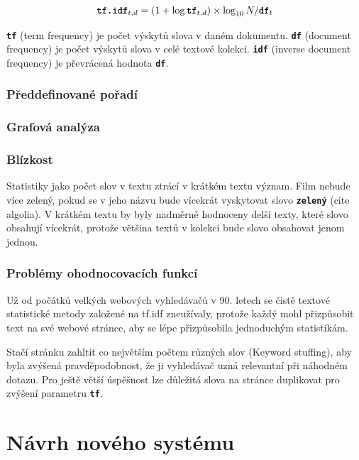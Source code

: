 \documentclass[11pt,letterpaper,oneside,openright]{book}
\newcommand{\bftt}[1]{\texttt{\textbf{#1}}}
\begin{document}
$$
\bftt{tf.idf}_{t, d} = (1 + \log \bftt{tf}_{t, d}) \times \log_{10} N / \bftt{df}_{t}
$$

\bftt{tf} (term frequency) je počet výskytů slova v daném dokumentu. \bftt{df}
(document frequency) je počet výskytů slova v celé textové kolekci. \bftt{idf}
(inverse document frequency) je převrácená hodnota \bftt{df}.

\subsection{Předdefinované pořadí}

\subsection{Grafová analýza}

\subsection{Blízkost}
Statistiky jako počet slov v textu ztrácí v krátkém textu význam. Film
nebude více zelený, pokud se v jeho názvu bude vícekrát vyskytovat slovo
\bftt{zelený} (cite algolia). V krátkém textu by byly nadměrně hodnoceny
delší texty, které slovo obsahují vícekrát, protože většina textů v
kolekci bude slovo obsahovat jenom jednou.

\subsection{Problémy ohodnocovacích funkcí}
Už od počátků velkých webových vyhledávačů v 90. letech se čistě textové
statistické metody založené na tf.idf zneužívaly, protože každý mohl
přizpůsobit text na své webové stránce, aby se lépe přizpůsobila
jednoduchým statistikám.

Stačí stránku zahltit co největším počtem různých slov (Keyword
stuffing), aby byla zvýšená pravděpodobnost, že ji vyhledávač uzná
relevantní při náhodném dotazu. Pro ještě větší úspěšnost lze důležitá
slova na stránce duplikovat pro zvýšení parametru \bftt{tf}.




\chapter{Návrh nového systému}
\end{document}
